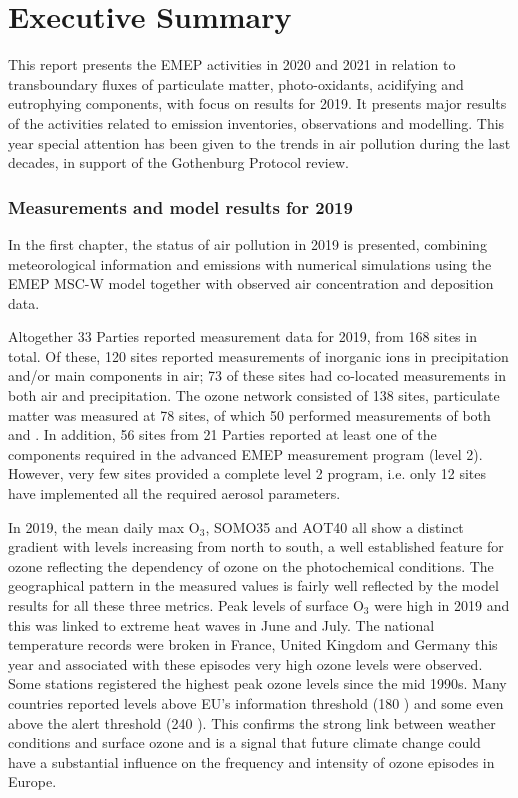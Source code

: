 \chapter*{Executive Summary}



This report presents the EMEP activities in 2020 and 2021 in relation to transboundary
fluxes of particulate matter, photo-oxidants, acidifying and
eutrophying components, with focus on results
for 2019. It presents major results of the activities related to emission inventories, observations and modelling. 
This year special attention has been given to the trends in air pollution during the last decades, in support of the Gothenburg Protocol review.

\subsection*{Measurements and model results for 2019} %
In the first chapter, the status of air pollution in 2019 is presented, combining 
meteorological information and emissions with numerical simulations using the EMEP MSC-W model together with observed air concentration and deposition data.

Altogether 33 Parties reported measurement data for 2019, from 168 sites in total. 
Of these, 120 sites reported measurements of inorganic ions in precipitation and/or 
main components in air; 73 of these sites had co-located measurements in both air and 
precipitation. The ozone network consisted of 138 sites, particulate matter was measured at 
78 sites, of which 50 performed measurements of both \PM[10] and \PM[2.5]. 
In addition, 56 sites from 21 Parties reported at least one of the components required in the advanced EMEP measurement program (level 2). However, very few sites provided a complete level 2 program, i.e. only 12 sites have implemented all the required aerosol parameters. 

In 2019, the mean daily max O$_3$, SOMO35 and AOT40 all show a distinct gradient with levels increasing from north to south, a well established feature for ozone reflecting the dependency of ozone on the photochemical conditions. The geographical pattern in the measured values is fairly well reflected by the model results for all these three metrics. Peak levels of surface O$_3$ were high in 2019 and this was linked to extreme heat waves in June and July. The national temperature records were broken in France, United Kingdom and Germany this year and associated with these episodes very high ozone levels were observed. Some stations registered the highest peak ozone levels since the mid 1990s. Many countries reported levels above EU's information threshold (180 \ug) and some even above the alert threshold (240 \ug). This confirms the strong link between weather conditions and surface ozone and is a signal that future climate change could have a substantial influence on the frequency and intensity of ozone episodes in Europe.

